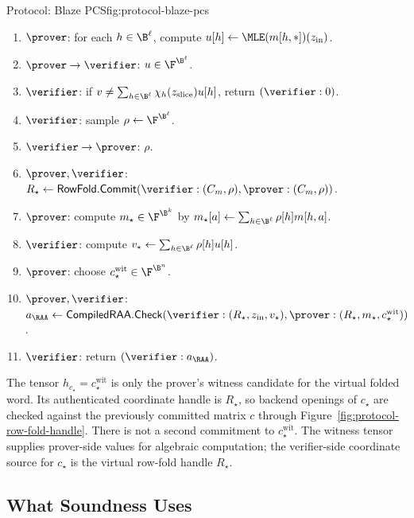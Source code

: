\begin{protocolbox}{Protocol: Blaze PCS}{fig:protocol-blaze-pcs}
\smallskip
\begin{enumerate}[leftmargin=0.24in,label=\textbf{O\arabic*.},itemsep=0.06em,topsep=0.06em,parsep=0pt]
  \item \(\prover\): for each \(h\in\B^\ell\), compute
        \(u[h]\gets\MLE(m[h,\ast])(z_{\mathrm{in}})\).
  \item \(\prover\to\verifier\): \(u\in\F^{\B^\ell}\).
  \item \(\verifier\): if
        \(v\ne\sum_{h\in\B^\ell}\chi_h(z_{\mathrm{slice}})u[h]\), return
        \((\verifier:0)\).
  \item \(\verifier\): sample \(\rho\leftarrow\F^{\B^\ell}\).
  \item \(\verifier\to\prover\): \(\rho\).
  \item \(\prover,\verifier\): \(R_\star\gets
        \mathsf{RowFold.Commit}(\verifier:(C_m,\rho),\prover:(C_m,\rho))\).
  \item \(\prover\): compute \(m_\star\in\F^{\B^k}\) by
        \(m_\star[a]\gets\sum_{h\in\B^\ell}\rho[h]m[h,a]\).
  \item \(\verifier\): compute
        \(v_\star\gets\sum_{h\in\B^\ell}\rho[h]u[h]\).
  \item \(\prover\): choose \(c_\star^{\mathrm{wit}}\in\F^{\B^n}\).
  \item \(\prover,\verifier\): \(a_{\RAA}\gets
        \mathsf{CompiledRAA.Check}
        (\verifier:(R_\star,z_{\mathrm{in}},v_\star),
        \prover:(R_\star,m_\star,c_\star^{\mathrm{wit}}))\).
  \item \(\verifier\): return \((\verifier:a_{\RAA})\).
\end{enumerate}
\end{protocolbox}

The tensor \(h_{c_\star}=c_\star^{\mathrm{wit}}\) is only the prover's witness
candidate for the virtual folded word.  Its authenticated coordinate handle is
\(R_\star\), so backend openings of \(c_\star\) are checked against the
previously committed matrix \(c\) through Figure~\ref{fig:protocol-row-fold-handle}.
There is not a second commitment to \(c_\star^{\mathrm{wit}}\).  The witness
tensor supplies prover-side values for algebraic computation; the verifier-side
coordinate source for \(c_\star\) is the virtual row-fold handle \(R_\star\).

\subsection{What Soundness Uses}

